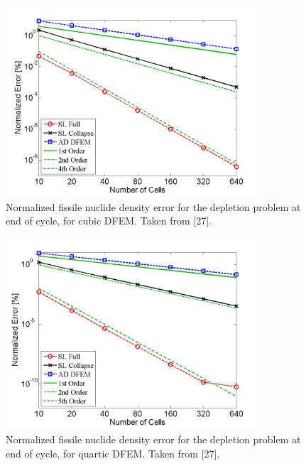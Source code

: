 \begin{figure}[!htp]
\centering
\includegraphics[width=9.5cm]{chapter5_depletion/FS_P3_norm_err.png}
\caption{Normalized fissile nuclide density error for the depletion problem at end of cycle, for cubic DFEM.  Taken from [27].}
\label{fig:depletion_NFS_p3}
\end{figure}

\begin{figure}[!hbp]
\centering
\includegraphics[width=9.5cm]{chapter5_depletion/FS_P4_norm_err.png}
\caption{Normalized fissile nuclide density error for the depletion problem at end of cycle, for quartic DFEM.  Taken from [27].}
\label{fig:depletion_NFS_p4}
\end{figure}

\pagebreak

